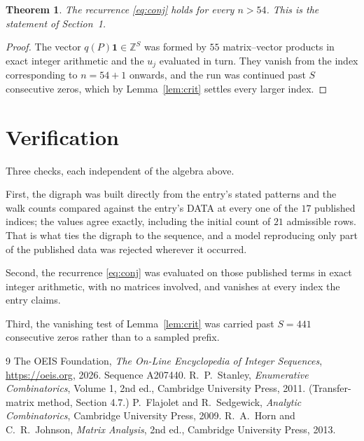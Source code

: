\documentclass[11pt,a4paper]{article}
\theoremstyle{plain}
\newtheorem{theorem}{Theorem}
\theoremstyle{definition}
\begin{document}
\begin{theorem}
The recurrence \eqref{eq:conj} holds for every $n>54$. This is the statement of
Section~1.
\end{theorem}

\begin{proof}
The vector $q(P)\mathbf{1}\in\mathbb{Z}^{S}$ was formed by $55$ matrix--vector
products in exact integer arithmetic and the $u_j$ evaluated in turn. They vanish from the
index corresponding to $n=54+1$ onwards, and the run was continued past $S$ consecutive
zeros, which by Lemma~\ref{lem:crit} settles every larger index.
\end{proof}

\section{Verification}

Three checks, each independent of the algebra above.

First, the digraph was built directly from the entry's stated patterns and the walk counts
compared against the entry's DATA at every one of the $17$ published indices; the
values agree exactly, including the initial count of $21$ admissible rows. That is
what ties the digraph to the sequence, and a model reproducing only part of the published
data was rejected wherever it occurred.

Second, the recurrence \eqref{eq:conj} was evaluated on those published terms in exact
integer arithmetic, with no matrices involved, and vanishes at every index the entry claims.

Third, the vanishing test of Lemma~\ref{lem:crit} was carried past $S=441$ consecutive
zeros rather than to a sampled prefix.

\begin{thebibliography}{9}
 The OEIS Foundation, \emph{The On-Line Encyclopedia of Integer
Sequences}, \url{https://oeis.org}, 2026. Sequence A207440.
 R.~P.~Stanley, \emph{Enumerative Combinatorics}, Volume 1, 2nd ed.,
Cambridge University Press, 2011. (Transfer-matrix method, Section 4.7.)
 P.~Flajolet and R.~Sedgewick, \emph{Analytic Combinatorics}, Cambridge
University Press, 2009.
 R.~A.~Horn and C.~R.~Johnson, \emph{Matrix Analysis}, 2nd ed., Cambridge
University Press, 2013.
\end{thebibliography}
\end{document}
